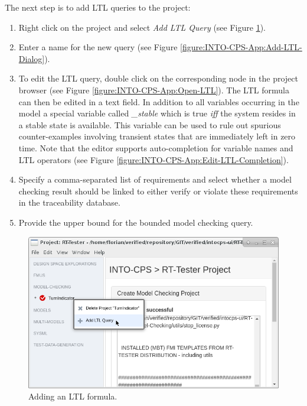 The next step is to add LTL queries to the project:
%
%
%
\begin{enumerate}
\item  Right click on the project and select \emph{Add LTL Query} (see Figure \ref{figure:INTO-CPS-App:Add-LTL}).
%
\item  Enter a name for the new query (see Figure \ref{figure:INTO-CPS-App:Add-LTL-Dialog}).
%
\item  To edit the LTL query, double click on the corresponding node in the project browser
(see Figure \ref{figure:INTO-CPS-App:Open-LTL}).  The LTL formula can then be edited in a text field.
In addition to all variables occurring in the model a special variable called \emph{\_stable} which is true \emph{iff} the system resides in a stable state is available.
This variable can be used to rule out spurious counter-examples involving transient states
that are immediately left in zero time.
Note that the editor supports
auto-completion for variable names and LTL operators (see
Figure \ref{figure:INTO-CPS-App:Edit-LTL-Completion}).
%
\item Specify a comma-separated list of requirements and select whether a
model checking result should be linked to either verify or violate these requirements
in the traceability database.
%
\item  Provide the upper bound for the bounded model checking query.
\end{enumerate}
%
%
%
\begin{figure}[ht]
    \centerline{\includegraphics[scale=0.4]{figures/VSI-MC_Add-LTL}}
    \caption{Adding an LTL formula.}
    \label{figure:INTO-CPS-App:Add-LTL}
\end{figure}

